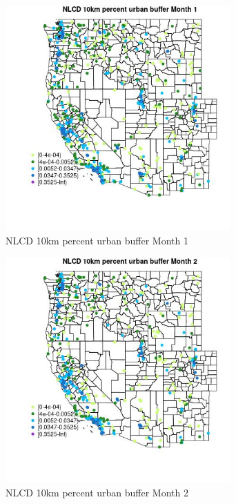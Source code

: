 \begin{figure} 
\centering  
\includegraphics[width=0.77\textwidth]{Code_Outputs/Report_ML_input_PM25_Step4_part_e_de_duplicated_aves_compiled_2019-05-18wNAs_MapObsMo1NLCD_10km_percent_urban_buffer.jpg} 
\caption{\label{fig:Report_ML_input_PM25_Step4_part_e_de_duplicated_aves_compiled_2019-05-18wNAsMapObsMo1NLCD_10km_percent_urban_buffer}NLCD 10km percent urban buffer Month 1} 
\end{figure} 
 

\begin{figure} 
\centering  
\includegraphics[width=0.77\textwidth]{Code_Outputs/Report_ML_input_PM25_Step4_part_e_de_duplicated_aves_compiled_2019-05-18wNAs_MapObsMo2NLCD_10km_percent_urban_buffer.jpg} 
\caption{\label{fig:Report_ML_input_PM25_Step4_part_e_de_duplicated_aves_compiled_2019-05-18wNAsMapObsMo2NLCD_10km_percent_urban_buffer}NLCD 10km percent urban buffer Month 2} 
\end{figure} 
 

